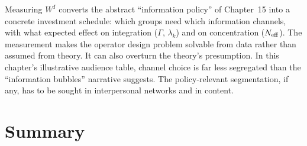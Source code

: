 \documentclass[../structural_economics_book.tex]{subfiles}
\begin{document}
\begin{keyinsight}
Measuring $W^I$ converts the abstract ``information policy'' of Chapter~15 into a concrete investment schedule: which groups need which information channels, with what expected effect on integration ($\Gamma$, $\lambda_k$) and on concentration ($N_{\text{eff}}$). The measurement makes the operator design problem solvable from data rather than assumed from theory. It can also overturn the theory's presumption. In this chapter's illustrative audience table, channel choice is far less segregated than the ``information bubbles'' narrative suggests. The policy-relevant segmentation, if any, has to be sought in interpersonal networks and in content.
\end{keyinsight}


\section{Summary}
\label{ch21:sec:summary}
\end{document}
